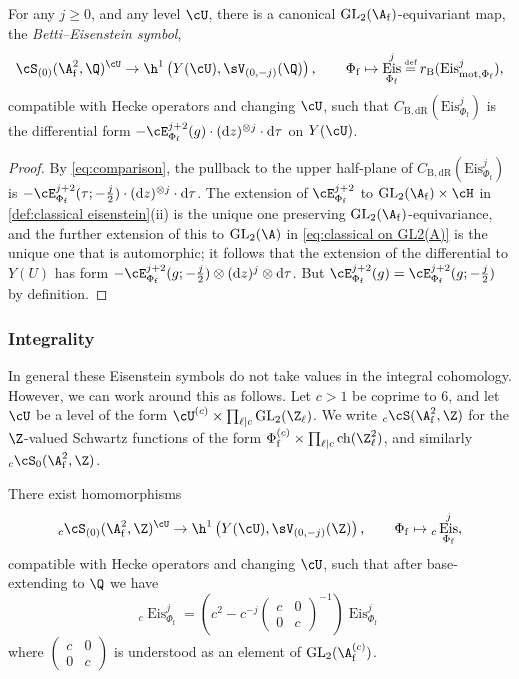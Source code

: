 \documentclass[10pt,reqno,a4paper]{amsart}
\newcommand{\stbt}[4]{\left(\begin{smallmatrix}#1 & #2\\#3&#4\end{smallmatrix}\right)}
\newcommand{\Phif}{{\Phi\subf}}
\newcommand{\LSkn}{\sV_{(0,-j)}}
\newcommand{\subf}{_{\mathrm{f}}}
\DeclareMathOperator{\Eis}{Eis}
\newcommand{\GL}{\mathrm{GL}}
\begin{document}
\begin{corollary}\label{cor:betti-eisenstein}
For any $j \ge 0$, and any level $\cU$, there is a canonical $\GL_2(\A\subf)$-equivariant map, the \emph{Betti--Eisenstein symbol},
\[
\cS_{(0)}(\A\subf^2, \Q)^{\cU}\to \h^1\left(Y(\cU), \LSkn(\Q)\right),\qquad \Phif \mapsto \Eis^j_{\Phif} \defeq r_{\mathrm{B}}(\mathrm{Eis}_{\mathrm{mot},\Phif}^j),
\]
compatible with Hecke operators and changing $\cU$, such that $C_{\mathrm{B,dR}}(\mathrm{Eis}_\Phif^j)$ is the differential form
$-\cE^{j+2}_\Phif(g) \cdot (\mathrm{d}z)^{\otimes j} \cdot \mathrm{d}\tau$ on $Y(\cU)$.
\end{corollary}

\begin{proof}
By \eqref{eq:comparison}, the pullback to the upper half-plane of $C_{\mathrm{B,dR}}(\mathrm{Eis}_\Phif^j)$ is $-\cE^{j+2}_{\Phif}(\tau;-\tfrac{j}{2}) \cdot (\mathrm{d}z)^{\otimes j} \cdot \mathrm{d}\tau$. The extension of $\cE_{\Phif}^{j+2}$ to $\GL_2(\A\subf) \times \cH$ in \cref{def:classical eisenstein}(ii) is the unique one preserving $\GL_2(\A\subf)$-equivariance, and the further extension of this to $\GL_2(\A)$ in \eqref{eq:classical on GL2(A)} is the unique one that is automorphic; it follows that the extension of the differential to $Y(U)$ has form $-\cE^{j+2}_{\Phif}(g;-\tfrac{j}{2})\otimes (\mathrm{d}z)^j \otimes \mathrm{d}\tau$. But $\cE^{j+2}_{\Phif}(g) = \cE^{j+2}_{\Phif}(g;-\tfrac{j}{2})$ by definition.
\end{proof}



\subsubsection{Integrality}\label{sec:Eisenstein integrality}
In general these Eisenstein symbols do not take values in the integral cohomology. However, we can work around this as follows. Let $c > 1$ be coprime to $6$, and let $\cU$ be a level of the form $\cU^{(c)} \times \prod_{\ell \mid c} \GL_2(\Z_\ell)$. We write ${}_c \cS(\A\subf^2, \Z)$ for the $\Z$-valued Schwartz functions of the form $\Phi\subf^{(c)} \times \prod_{\ell \mid c} \operatorname{ch}(\Z_\ell^2)$, and similarly ${}_c \cS_0(\A\subf^2, \Z)$.

\begin{theorem}\label{thm:integral betti eisenstein}
There exist homomorphisms
\[
{}_c \cS_{(0)}(\A\subf^2, \Z)^{\cU}\to \h^1\left(Y(\cU), \LSkn({\Z})\right),\qquad \Phif \mapsto {}_c\Eis^j_{\Phif},
\]
compatible with Hecke operators and changing $\cU$, such that after base-extending to $\Q$ we have
\[ {}_c\Eis^j_{\Phif} = \left(c^2 - c^{-j} \stbt{c}{0}{0}{c}^{-1}\right)\Eis^j_{\Phif} \]
where $\stbt{c}{0}{0}{c}$ is understood as an element of $\GL_2(\A\subf^{(c)})$.
\end{theorem}
\end{document}
